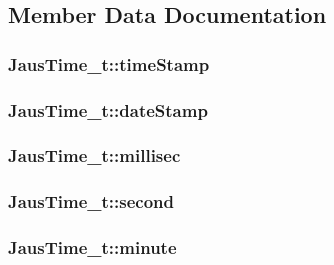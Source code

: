 \subsection{Member Data Documentation}
\hypertarget{structJausTime__t_d8fac0a7fbf31abd52985347900bd042}{
\subsubsection[timeStamp]{ {\bf JausTime\_\-t::timeStamp}}}
\label{structJausTime__t_d8fac0a7fbf31abd52985347900bd042}


\hypertarget{structJausTime__t_1b86c063686b07f11d803b1d4b1e4658}{
\subsubsection[dateStamp]{ {\bf JausTime\_\-t::dateStamp}}}
\label{structJausTime__t_1b86c063686b07f11d803b1d4b1e4658}


\hypertarget{structJausTime__t_46cb56461067627813f9ebab05f7b98a}{
\subsubsection[millisec]{ {\bf JausTime\_\-t::millisec}}}
\label{structJausTime__t_46cb56461067627813f9ebab05f7b98a}


\hypertarget{structJausTime__t_e4d5d34c9c6fe58411a5f5349fbbdd26}{
\subsubsection[second]{ {\bf JausTime\_\-t::second}}}
\label{structJausTime__t_e4d5d34c9c6fe58411a5f5349fbbdd26}


\hypertarget{structJausTime__t_2db8ba5d1dd85dbe1a1c87cc4cd6b7bf}{
\subsubsection[minute]{ {\bf JausTime\_\-t::minute}}}
\label{structJausTime__t_2db8ba5d1dd85dbe1a1c87cc4cd6b7bf}


